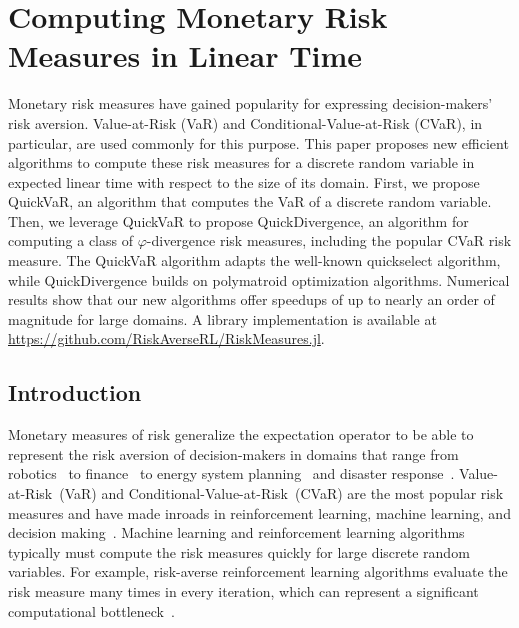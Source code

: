 \chapter{Computing Monetary Risk Measures in Linear Time}\label{ch:fast-risk}

Monetary risk measures have gained popularity for expressing decision-makers' risk aversion. Value-at-Risk (VaR) and Conditional-Value-at-Risk (CVaR), in particular, are used commonly for this purpose. This paper proposes new efficient algorithms to compute these risk measures for a discrete random variable in expected linear time with respect to the size of its domain. First, we propose QuickVaR, an algorithm that computes the VaR of a discrete random variable. Then, we leverage QuickVaR to propose QuickDivergence, an algorithm for computing a class of $\varphi$-divergence risk measures, including the popular CVaR risk measure. The QuickVaR algorithm adapts the well-known quickselect algorithm, while QuickDivergence builds on polymatroid optimization algorithms. Numerical results show that our new algorithms offer speedups of up to nearly an order of magnitude for large domains. A library implementation is available at \url{https://github.com/RiskAverseRL/RiskMeasures.jl}.

\section{Introduction}\label{sec:intro}


Monetary measures of risk generalize the expectation operator to be able to represent the risk aversion of decision-makers in domains that range from robotics~\cite{akella2024risk,majumdar2020should,benrabah2024review} to finance~\cite{Follmer2016} to energy system planning~\cite{Inzunza2016} and disaster response~\cite{Barahona2013}. Value-at-Risk~(VaR) and Conditional-Value-at-Risk~(CVaR) are the most popular risk measures and have made inroads in reinforcement learning, machine learning, and decision making~\cite{Petrik2024,Muni2026,Sadana2026,Godbout2025,Xia2022,Ding2023,chavez2026sample}. Machine learning and reinforcement learning algorithms typically must compute the risk measures quickly for large discrete random variables. For example, risk-averse reinforcement learning algorithms evaluate the risk measure many times in every iteration, which can represent a significant computational bottleneck~\cite{Ho2021,Ho2018,Ho2022,Hau2023a,Hau2025}.

